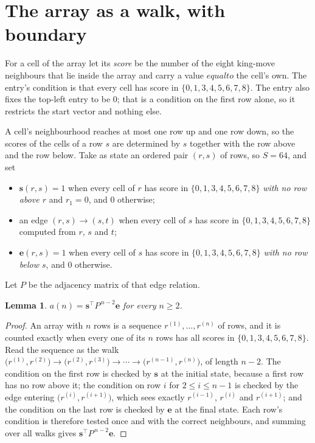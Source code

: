 \documentclass[11pt,a4paper]{article}
\theoremstyle{plain}
\newtheorem{lemma}[theorem]{Lemma}
\theoremstyle{definition}
\begin{document}
\section{The array as a walk, with boundary}

For a cell of the array let its \emph{score} be the number of the eight king-move neighbours that lie inside
the array and carry a value $equal to$ the cell's own. The entry's condition is that every cell
has score in $\{0,1,3,4,5,6,7,8\}$. The entry also fixes the top-left entry to be $0$; that is a condition on the first row alone, so it restricts the start vector and nothing else.

A cell's neighbourhood reaches at most one row up and one row down, so the scores of the
cells of a row $s$ are determined by $s$ together with the row above and the row below.
Take as state an ordered pair $(r,s)$ of rows, so $S=64$, and set
\begin{itemize}
\item $\mathbf{s}(r,s)=1$ when every cell of $r$ has score in $\{0,1,3,4,5,6,7,8\}$ \emph{with no row
above $r$} and $r_1=0$, and $0$ otherwise;
\item an edge $(r,s)\to(s,t)$ when every cell of $s$ has score in $\{0,1,3,4,5,6,7,8\}$ computed from
$r$, $s$ and $t$;
\item $\mathbf{e}(r,s)=1$ when every cell of $s$ has score in $\{0,1,3,4,5,6,7,8\}$ \emph{with no row
below $s$}, and $0$ otherwise.
\end{itemize}
Let $P$ be the adjacency matrix of that edge relation.

\begin{lemma}\label{lem:walk}
$a(n)=\mathbf{s}^{\!\top}P^{\,n-2}\mathbf{e}$ for every $n\ge2$.
\end{lemma}

\begin{proof}
An array with $n$ rows is a sequence $r^{(1)},\dots,r^{(n)}$ of rows, and it is counted
exactly when every one of its $n$ rows has all scores in $\{0,1,3,4,5,6,7,8\}$. Read the sequence as the
walk $\bigl(r^{(1)},r^{(2)}\bigr)\to\bigl(r^{(2)},r^{(3)}\bigr)\to\cdots\to
\bigl(r^{(n-1)},r^{(n)}\bigr)$, of length $n-2$. The condition on the first row is
checked by $\mathbf{s}$ at the initial state, because a first row has no row above it; the
condition on row $i$ for $2\le i\le n-1$ is checked by the edge entering
$\bigl(r^{(i)},r^{(i+1)}\bigr)$, which sees exactly $r^{(i-1)}$, $r^{(i)}$ and
$r^{(i+1)}$; and the condition on the last row is checked by $\mathbf{e}$ at the final
state. Each row's condition is therefore tested once and with the correct neighbours, and
summing over all walks gives $\mathbf{s}^{\!\top}P^{\,n-2}\mathbf{e}$.
\end{proof}
\end{document}
